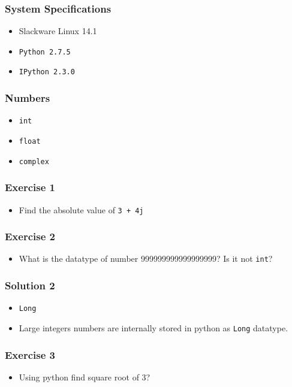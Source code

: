 \documentclass[17pt,compress]{beamer}
\begin{document}
\begin{frame}
\frametitle{System Specifications}\pause
\begin{itemize}
\item Slackware Linux 14.1\pause
\item \texttt{Python 2.7.5} \pause
\item \texttt{IPython 2.3.0}
\end{itemize}
\end{frame}
\begin{frame}
\frametitle{Numbers}
\label{sec-3}


\begin{itemize}
\item \texttt{int}
\item \texttt{float}
\item \texttt{complex}
\end{itemize}
\end{frame}
\begin{frame}
\frametitle{Exercise 1}
\label{sec-4}


\begin{itemize}
\item Find the absolute value of \texttt{3 + 4j}
\end{itemize}
\end{frame}

\begin{frame}
\frametitle{Exercise 2}
\label{sec-5}
\begin{itemize}
\item What is the datatype of number 999999999999999999? Is it not \texttt{int}?
\end{itemize}
\end{frame}
\begin{frame}
\frametitle{Solution 2}
\label{sec-6}

\begin{itemize}
\item \texttt{Long}
\item Large integers numbers are internally stored in python as \texttt{Long}
    datatype.
\end{itemize}
\end{frame}
\begin{frame}
\frametitle{Exercise 3}
\label{sec-7}

\begin{itemize}
\item Using python find square root of 3?
\end{itemize}
\end{frame}
\end{document}
